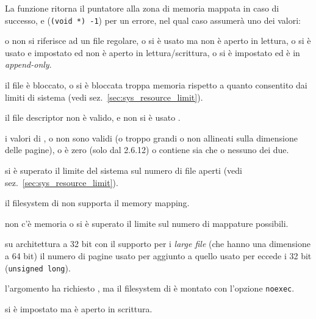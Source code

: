 \begin{funcproto}
{La funzione ritorna il puntatore alla zona di memoria mappata in caso di
  successo, e  (\texttt{(void *) -1}) per un errore, nel
  qual caso  assumerà uno dei valori:
  \begin{errlist}
    \item[\errcode{EACCES}] o  non si riferisce ad un file regolare,
      o si è usato  ma  non è aperto in lettura,
      o si è usato  e impostato  ed
       non è aperto in lettura/scrittura, o si è impostato
       ed  è in \textit{append-only}.
    \item[\errcode{EAGAIN}] il file è bloccato, o si è bloccata troppa memoria
      rispetto a quanto consentito dai limiti di sistema (vedi
      sez.~\ref{sec:sys_resource_limit}).
    \item[\errcode{EBADF}] il file descriptor non è valido, e non si è usato
      .
    \item[\errcode{EINVAL}] i valori di ,  o
       non sono validi (o troppo grandi o non allineati sulla
      dimensione delle pagine), o  è zero (solo dal 2.6.12)
      o  contiene sia  che
       o nessuno dei due.
    \item[\errcode{ENFILE}] si è superato il limite del sistema sul numero di
      file aperti (vedi sez.~\ref{sec:sys_resource_limit}).
    \item[\errcode{ENODEV}] il filesystem di  non supporta il memory
      mapping.
    \item[\errcode{ENOMEM}] non c'è memoria o si è superato il limite sul
      numero di mappature possibili.
    \item[\errcode{EOVERFLOW}] su architettura a 32 bit con il supporto per i
      \textit{large file} (che hanno una dimensione a 64 bit) il numero di
      pagine usato per  aggiunto a quello usato
      per  eccede i 32 bit (\texttt{unsigned long}).
    \item[\errcode{EPERM}] l'argomento  ha richiesto
      , ma il filesystem di  è montato con
      l'opzione \texttt{noexec}.
    \item[\errcode{ETXTBSY}] si è impostato  ma
       è aperto in scrittura.
  \end{errlist}
}
\end{funcproto}

